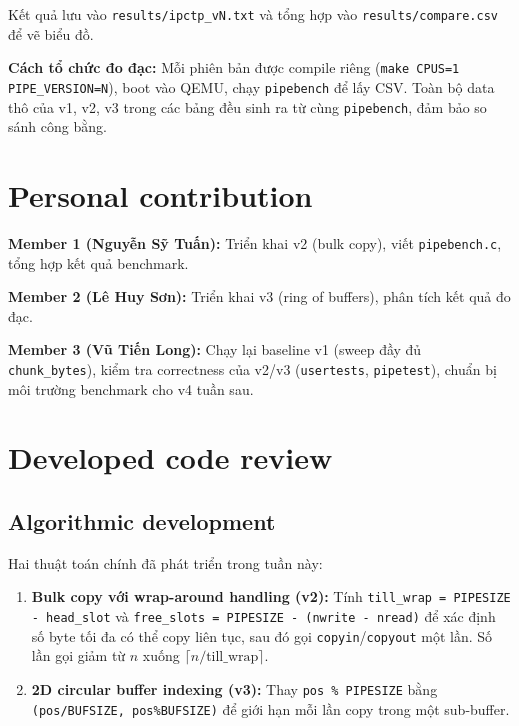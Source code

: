 \documentclass[11pt,a4paper]{article}
\begin{document}
Kết quả lưu vào \texttt{results/ipctp\_vN.txt} và tổng hợp vào \texttt{results/compare.csv} để vẽ biểu đồ.

\textbf{Cách tổ chức đo đạc:} Mỗi phiên bản được compile riêng (\texttt{make CPUS=1 PIPE\_VERSION=N}), boot vào QEMU, chạy \texttt{pipebench} để lấy CSV. Toàn bộ data thô của v1, v2, v3 trong các bảng đều sinh ra từ cùng \texttt{pipebench}, đảm bảo so sánh công bằng.

\section{Personal contribution}

\textbf{Member 1 (Nguyễn Sỹ Tuấn):} Triển khai v2 (bulk copy), viết \texttt{pipebench.c}, tổng hợp kết quả benchmark.

\textbf{Member 2 (Lê Huy Sơn):} Triển khai v3 (ring of buffers), phân tích kết quả đo đạc.

\textbf{Member 3 (Vũ Tiến Long):} Chạy lại baseline v1 (sweep đầy đủ \texttt{chunk\_bytes}), kiểm tra correctness của v2/v3 (\texttt{usertests}, \texttt{pipetest}), chuẩn bị môi trường benchmark cho v4 tuần sau.

\section{Developed code review}

\subsection{Algorithmic development}

Hai thuật toán chính đã phát triển trong tuần này:

\begin{enumerate}
  \item \textbf{Bulk copy với wrap-around handling (v2):} Tính \texttt{till\_wrap = PIPESIZE - head\_slot} và \texttt{free\_slots = PIPESIZE - (nwrite - nread)} để xác định số byte tối đa có thể copy liên tục, sau đó gọi \texttt{copyin}/\texttt{copyout} một lần. Số lần gọi giảm từ $n$ xuống $\lceil n / \text{till\_wrap} \rceil$.
  \item \textbf{2D circular buffer indexing (v3):} Thay \texttt{pos \% PIPESIZE} bằng \texttt{(pos/BUFSIZE, pos\%BUFSIZE)} để giới hạn mỗi lần copy trong một sub-buffer.
\end{enumerate}
\end{document}
